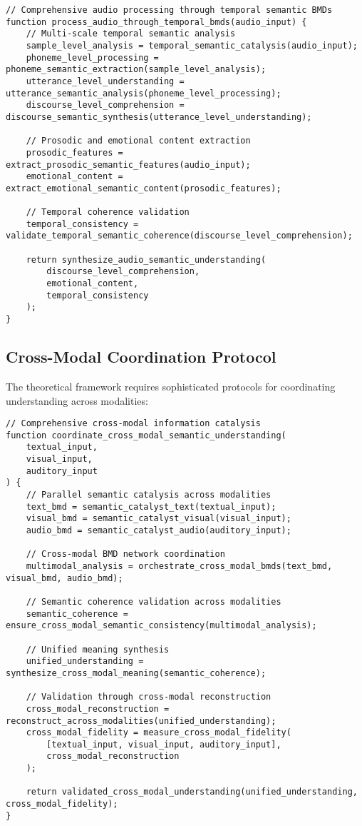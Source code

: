 \documentclass[12pt,a4paper,twoside]{article}
\begin{document}
\begin{lstlisting}[caption=Theoretical Audio BMD Processing]
// Comprehensive audio processing through temporal semantic BMDs
function process_audio_through_temporal_bmds(audio_input) {
    // Multi-scale temporal semantic analysis
    sample_level_analysis = temporal_semantic_catalysis(audio_input);
    phoneme_level_processing = phoneme_semantic_extraction(sample_level_analysis);
    utterance_level_understanding = utterance_semantic_analysis(phoneme_level_processing);
    discourse_level_comprehension = discourse_semantic_synthesis(utterance_level_understanding);

    // Prosodic and emotional content extraction
    prosodic_features = extract_prosodic_semantic_features(audio_input);
    emotional_content = extract_emotional_semantic_content(prosodic_features);

    // Temporal coherence validation
    temporal_consistency = validate_temporal_semantic_coherence(discourse_level_comprehension);

    return synthesize_audio_semantic_understanding(
        discourse_level_comprehension,
        emotional_content,
        temporal_consistency
    );
}
\end{lstlisting}

\subsection{Cross-Modal Coordination Protocol}

The theoretical framework requires sophisticated protocols for coordinating understanding across modalities:

\begin{lstlisting}[caption=Advanced Cross-Modal BMD Coordination]
// Comprehensive cross-modal information catalysis
function coordinate_cross_modal_semantic_understanding(
    textual_input,
    visual_input,
    auditory_input
) {
    // Parallel semantic catalysis across modalities
    text_bmd = semantic_catalyst_text(textual_input);
    visual_bmd = semantic_catalyst_visual(visual_input);
    audio_bmd = semantic_catalyst_audio(auditory_input);

    // Cross-modal BMD network coordination
    multimodal_analysis = orchestrate_cross_modal_bmds(text_bmd, visual_bmd, audio_bmd);

    // Semantic coherence validation across modalities
    semantic_coherence = ensure_cross_modal_semantic_consistency(multimodal_analysis);

    // Unified meaning synthesis
    unified_understanding = synthesize_cross_modal_meaning(semantic_coherence);

    // Validation through cross-modal reconstruction
    cross_modal_reconstruction = reconstruct_across_modalities(unified_understanding);
    cross_modal_fidelity = measure_cross_modal_fidelity(
        [textual_input, visual_input, auditory_input],
        cross_modal_reconstruction
    );

    return validated_cross_modal_understanding(unified_understanding, cross_modal_fidelity);
}
\end{lstlisting}
\end{document}
